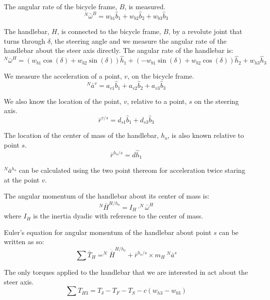 \documentclass[]{article}
\begin{document}
The angular rate of the bicycle frame, $B$, is measured.
\begin{equation}
  ^N\bar{\omega}^B = w_{b1}\hat{b}_1 + w_{b2}\hat{b}_2 + w_{b3}\hat{b}_3
\end{equation}

The handlebar, $H$, is connected to the bicycle frame, $B$, by a revolute joint
that turns through $\delta$, the steering angle and we measure the angular rate
of the handlebar about the steer axis directly. The angular rate of the
handlebar is:
\begin{equation}
  ^N\bar{\omega}^H = (w_{b1}\cos(\delta) + w_{b2}\sin(\delta))\hat{h}_1 +
    (-w_{b1}\sin(\delta) + w_{b2}\cos(\delta))\hat{h}_2 + w_{h3}\hat{h}_3
\end{equation}

We measure the acceleration of a point, $v$, on the bicycle frame.
\begin{equation}
  ^N\bar{a}^v = a_{v1}\hat{b}_1 + a_{v2}\hat{b}_2 + a_{v3}\hat{b}_3
\end{equation}

We also know the location of the point, $v$, relative to a point, $s$ on the
steering axis.
\begin{equation}
    \bar{r}^{v/s} = d_{s1}\hat{b}_1 + d_{s3}\hat{b}_3
\end{equation}

The location of the center of mass of the handlebar, $h_o$, is also known
relative to point $s$.
\begin{equation}
    \bar{r}^{h_o/s} = d\hat{h}_1
\end{equation}

$^N\bar{a}^{h_o}$ can be calculated using the two point thereom for
acceleration twice staring at the point $v$.

The angular momentum of the handlebar about its center of mass is:
\begin{equation}
    ^N\bar{H}^{H/h_o} = I_H \cdot ^N\bar{\omega}^H
\end{equation}
where $I_H$ is the inertia dyadic with reference to the center of mass.

Euler's equation for angular momentum of the handlebar about point $s$ can be
written as so:
\begin{equation}
    \sum \bar{T}_H = ^N\dot{\bar{H}}^{H/h_o} + \bar{r}^{h_o/s} \times m_H
    \ ^N\bar{a}^s
\end{equation}

The only torques applied to the handlebar that we are interested in act about the steer axis.
\begin{equation}
    \sum T_{H3} = T_\delta - T_F - T_S - c(w_{h3} - w_{b3})
\end{equation}
\end{document}
